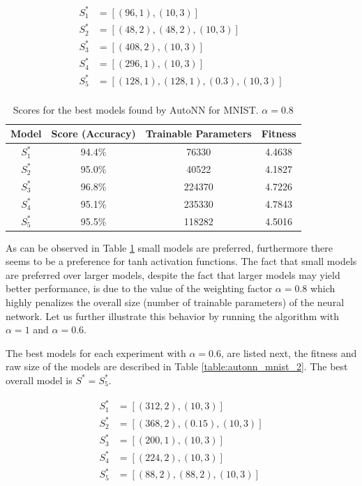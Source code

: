 \documentclass[journal]{IEEEtran}
\begin{document}
\begin{align*}
S^*_1 & = \left[ (96, 1), (10, 3) \right] \\
S^*_2 & = \left[ (48, 2), (48, 2), (10, 3) \right] \\
S^*_3 & = \left[ (408, 2), (10, 3) \right] \\
S^*_4 & = \left[ (296, 1),  (10, 3) \right] \\
S^*_5 & = \left[ (128, 1), (128, 1), (0.3),  (10, 3) \right] \\
\end{align*}

\begin{table}[!htb]
\begin{center}
\begin{tabular}{| c | c | c | c |}
\hline
Model & Score (Accuracy) & Trainable Parameters & Fitness\\
\hline
$S^*_1$ & 94.4\% & 76330 & 4.4638\\
$S^*_2$ & 95.0\% & 40522 & 4.1827\\
$S^*_3$ & 96.8\% & 224370 & 4.7226\\
$S^*_4$ & 95.1\% & 235330 & 4.7843\\
$S^*_5$ & 95.5\% & 118282 & 4.5016\\
\hline
\end{tabular}
\end{center}
\caption{Scores for the best models found by AutoNN for MNIST. $\alpha = 0.8$}
\label{table:autonn_mnist_1}
\end{table}

As can be observed in Table \ref{table:autonn_mnist_1} small models are preferred, furthermore there seems to be a preference for tanh activation functions. The fact that small models are preferred over larger models, despite the fact that larger models may yield better performance, is due to the value of the weighting factor $\alpha = 0.8$ which highly penalizes the overall size (number of trainable parameters) of the neural network.  Let us further illustrate this behavior by running the algorithm with $\alpha = 1$ and $\alpha = 0.6$.

The best models for each experiment with $\alpha = 0.6$, are listed next, the fitness and raw size of the models are described in Table \ref{table:autonn_mnist_2}. The best overall model is $S^* = S^*_5$.

\begin{align*}
S^*_1 & = \left[ (312, 2), (10, 3) \right] \\
S^*_2 & = \left[ (368, 2), (0.15), (10, 3) \right] \\
S^*_3 & = \left[ (200, 1), (10, 3) \right] \\
S^*_4 & = \left[ (224, 2),  (10, 3) \right] \\
S^*_5 & = \left[ (88, 2), (88, 2), (10, 3) \right] \\
\end{align*}
\end{document}
